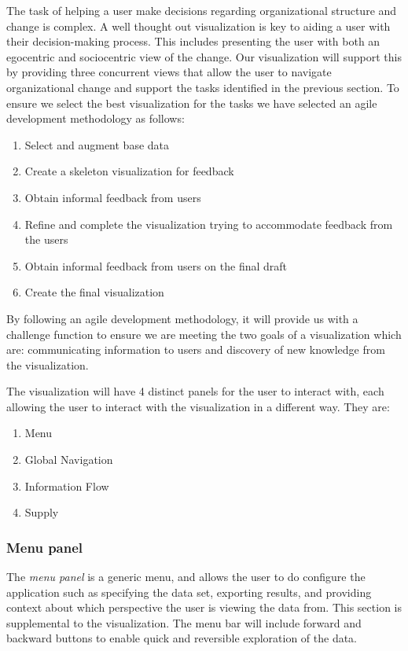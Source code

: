 \documentclass{soups}
\begin{document}
The task of helping a user make decisions regarding organizational structure and change is complex.  A well thought out visualization is key to aiding a user with their decision-making process.  This includes presenting the user with both an egocentric and sociocentric view of the change.  Our visualization will support this by providing three concurrent views that allow the user to navigate organizational change and support the tasks identified in the previous section.  To ensure we select the best visualization for the tasks we have selected an agile development methodology as follows:

\begin{enumerate}
\item Select and augment base data
\item Create a skeleton visualization for feedback
\item Obtain informal feedback from users
\item Refine and complete the visualization trying to accommodate feedback from the users
\item Obtain informal feedback from users on the final draft
\item Create the final visualization
\end{enumerate}

By following an agile development methodology, it will provide us with a challenge function to ensure we are meeting the two goals of a visualization which are: communicating information to users and discovery of new knowledge from the visualization. 

The visualization will have 4 distinct panels for the user to interact with, each allowing the user to interact with the visualization in a different way. They are:
\begin{enumerate}
\item Menu
\item Global Navigation
\item Information Flow
\item Supply
\end{enumerate}

\subsubsection{Menu panel}

The \emph{menu panel} is a generic menu, and allows the user to do configure the application such as specifying the data set, exporting results, and providing context about which perspective the user is viewing the data from. This section is supplemental to the visualization. The menu bar will include forward and backward buttons to enable quick and reversible exploration of the data.
\end{document}
